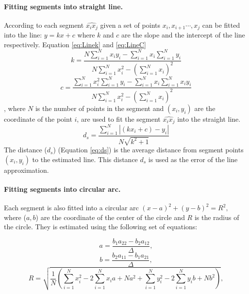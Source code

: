 \paragraph{Fitting segments into straight line.}
\label{sec:FittingSegmentIntoStraightLine}
According to \cite{CruveDivisionSwarm} each segment $\widehat{x_ix_j}$ given a set of points $x_i,x_{i+1} \cdots,x_j$ can be fitted into the line: $y=kx+c$ where $k$ and $c$ are the slope and the intercept of the line respectively. Equation \ref{eq:Linek} and \ref{eq:LineC} 
\begin{equation}
\label{eq:Linek}
k = \frac{{N\sum\limits_{i = 1}^N {x_i y_i }  - \sum\limits_{i = 1}^N {x_i } \sum\limits_{i = 1}^N {y_i } }}{{N\sum\limits_{i = 1}^N {x_i^2 }  - \left( {\sum\limits_{i = 1}^N {x_i } } \right)^2 }}
\end{equation}
\begin{equation}
\label{eq:LineC}
c = \frac{{\sum\limits_{i = 1}^N {x_i^2 } \sum\limits_{i = 1}^N {y_i }  - \sum\limits_{i = 1}^N {x_i } \sum\limits_{i = 1}^N {x_i y_i } }}{{N\sum\limits_{i = 1}^N {x_i^2 }  - \left( {\sum\limits_{i = 1}^N {x_i } } \right)^2 }}
\end{equation}
, where $N$ is the number of points in the segment and $(x_i, y_i)$ are the coordinate of the point $i$, are used to fit the segment $\widehat{x_ix_j}$ into the straight line.
\begin{equation}
\label{eq:ds}
 d_s  = \frac{{\sum\limits_{i = 1}^N {\left| {(kx_i  + c) - y_i } \right|} }}{{N\sqrt {k^2  + 1} }}
\end{equation}
The distance ($d_s$) (Equation \ref{eq:ds}) is the average distance from segment points $(x_i, y_i)$ to the estimated line. This distance $d_s$ is used as the error of the line approximation.
\paragraph{Fitting segments into circular arc.}
\label{sec:FittingSegmentcirculararc}
Each segment is also fitted into a circular arc $(x - a)^2  + (y - b)^2  = R^2, $ where ($a,b$) are the coordinate of the center of the circle and $R$ is the radius of the circle. They is estimated using the following set of equations: 
 
\begin{equation}
a = \frac{{b_{1}a_{22} - b_{2}a_{12}}}{\Delta},
\end{equation}
\begin{equation}
	b = \frac{{b_{2}a_{11} - b_{1}a_{21}}}{\Delta},
\end{equation}
\begin{equation}
R = \sqrt {\frac{1}{N}(\sum\limits_{i = 1}^N {x_i^2 }  - 2\sum\limits_{i = 1}^N {x_i a}  + Na^2  + \sum\limits_{i = 1}^N {y_i^2  - 2} \sum\limits_{i = 1}^N {y_i b + Nb^2 } )} ,
\end{equation}

